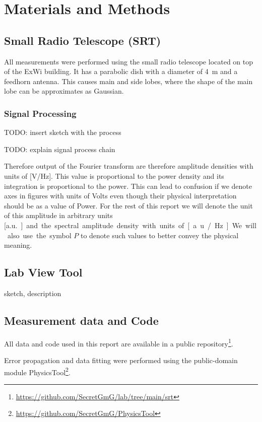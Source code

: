 
\section{Materials and Methods}

\subsection{Small Radio Telescope (SRT)}
All measurements were performed using the small radio telescope located on top of the ExWi building.
It has a parabolic dish with a diameter of \SI{4}{m} and a feedhorn antenna. This causes main and side lobes, where the shape of the main lobe can be approximates as Gaussian.

\subsubsection{Signal Processing}
TODO: insert sketch with the process

TODO: explain signal process chain

Therefore output of the Fourier transform are therefore amplitude densities with units of [\si{\volt/\hertz}]. This value is proportional to the power density and its integration is proportional to the power.
This can lead to confusion if we denote axes in figures with units of Volts even though their physical interpretation should be as a value of Power.
For the rest of this report we will denote the unit of this amplitude in arbitrary units [\si{a.u.}] and the spectral amplitude density with units of [\si{a.u./\hertz}].
We will also use the symbol $P$ to denote such values to better convey the physical meaning.

\subsection{Lab View Tool}
sketch, description


\subsection{Measurement data and Code}
All data and code used in this report are available in a public repository\footnote{\url{https://github.com/SecretGmG/lab/tree/main/srt}}.

Error propagation and data fitting were performed using the public-domain module PhysicsTool\footnote{\url{https://github.com/SecretGmG/PhysicsTool}}.